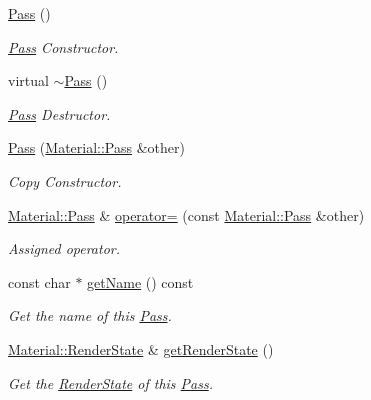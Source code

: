 \begin{DoxyCompactItemize}
\item 
\hyperlink{class_i_dream_sky_1_1_material_1_1_pass_acb73e4580b0eeec0d51c144ab33b7616}{Pass} ()
\begin{DoxyCompactList}\small\item\em \hyperlink{class_i_dream_sky_1_1_material_1_1_pass}{Pass} Constructor. \end{DoxyCompactList}\item 
virtual \hyperlink{class_i_dream_sky_1_1_material_1_1_pass_a8c351b64488af5bd772601b6e69d14fd}{$\sim$\+Pass} ()
\begin{DoxyCompactList}\small\item\em \hyperlink{class_i_dream_sky_1_1_material_1_1_pass}{Pass} Destructor. \end{DoxyCompactList}\item 
\hyperlink{class_i_dream_sky_1_1_material_1_1_pass_a235855b54aa05362e3d622681af51104}{Pass} (\hyperlink{class_i_dream_sky_1_1_material_1_1_pass}{Material\+::\+Pass} \&other)
\begin{DoxyCompactList}\small\item\em Copy Constructor. \end{DoxyCompactList}\item 
\hyperlink{class_i_dream_sky_1_1_material_1_1_pass}{Material\+::\+Pass} \& \hyperlink{class_i_dream_sky_1_1_material_1_1_pass_a34cc97c15834661bb7266c3147265f7d}{operator=} (const \hyperlink{class_i_dream_sky_1_1_material_1_1_pass}{Material\+::\+Pass} \&other)
\begin{DoxyCompactList}\small\item\em Assigned operator. \end{DoxyCompactList}\item 
const char $\ast$ \hyperlink{class_i_dream_sky_1_1_material_1_1_pass_a56a4219ed3f8d2a1cc6f4ecb6e28c691}{get\+Name} () const 
\begin{DoxyCompactList}\small\item\em Get the name of this \hyperlink{class_i_dream_sky_1_1_material_1_1_pass}{Pass}. \end{DoxyCompactList}\item 
\hyperlink{class_i_dream_sky_1_1_material_1_1_render_state}{Material\+::\+Render\+State} \& \hyperlink{class_i_dream_sky_1_1_material_1_1_pass_a4a412323035eacfe58026b5073d0f8b4}{get\+Render\+State} ()
\begin{DoxyCompactList}\small\item\em Get the \hyperlink{class_i_dream_sky_1_1_material_1_1_render_state}{Render\+State} of this \hyperlink{class_i_dream_sky_1_1_material_1_1_pass}{Pass}. \end{DoxyCompactList}\item 

\end{DoxyCompactItemize}
